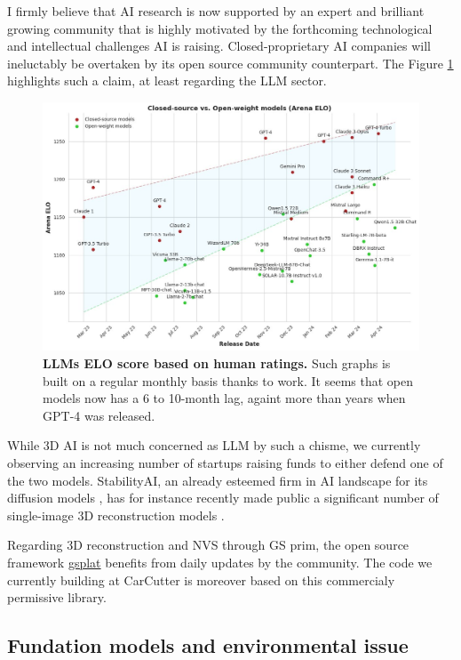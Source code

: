 I firmly believe that \ac{AI} research is now supported by an expert and brilliant growing community that is highly motivated by the forthcoming technological and intellectual challenges \ac{AI} is raising. Closed-proprietary \ac{AI} companies will ineluctably be overtaken by  its open source community counterpart. The Figure \ref{fig:conclusion-openclose} highlights such a claim, at least regarding the \ac{LLM} sector. 
\begin{figure}[htb!]
    \center
  \includegraphics[width=\linewidth]{images/conclusion/open-close.jpeg}
  \caption{\textbf{LLMs ELO score based on human ratings.} Such graphs is built on a regular monthly basis thanks to \citep{chiang2024chatbot} work. It seems that open models now has a 6 to 10-month lag, againt more than years when GPT-4 was released.}
  \label{fig:conclusion-openclose}
\end{figure}


While 3D \ac{AI} is not much concerned as \ac{LLM} by such a chisme, we currently observing an increasing number of startups raising funds to either defend one of the two models. StabilityAI, an already esteemed firm in \ac{AI} landscape for its diffusion models \citep{esser2024scaling}, has for instance recently made public a significant number of single-image 3D reconstruction models \citep{tochilkin2024triposr,voleti2024sv3d}. 

Regarding 3D reconstruction and \ac{NVS} through \ac{GS} prim, the open source framework \href{https://docs.gsplat.studio/main/}{gsplat} benefits from daily updates by the community. The code we currently building at CarCutter is moreover based on this commercialy permissive library. 

\subsection{Fundation models and environmental issue}

